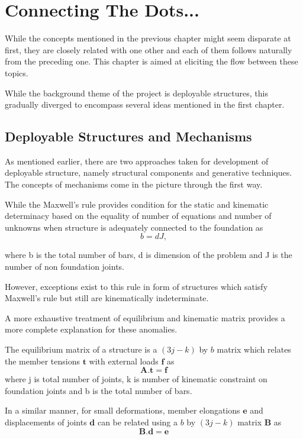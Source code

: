 \chapter{Connecting The Dots...}
While the concepts mentioned in the previous chapter might seem disparate at first, they are closely related with one other and each of them follows naturally from the preceding one. This chapter is aimed at eliciting the flow between these topics. 

While the background theme of the project is deployable structures, this gradually diverged to encompass several ideas mentioned in the first chapter.

\section{Deployable Structures and Mechanisms}
As mentioned earlier, there are two approaches taken for development of deployable structure, namely structural components and generative techniques. The concepts of mechanisms come in the picture through the first way. 

While the Maxwell's rule provides condition for the static and kinematic determinacy based on the equality of number of equations and number of unknowns when structure is adequately connected to the foundation as 
\begin{equation}
    b = dJ,
\label{eq:cacona}
\end{equation}

\noindent where b is the total number of bars, d is dimension of the problem and J is the number of non foundation joints.

However, exceptions exist to this rule in form of structures which satisfy Maxwell's rule but still are kinematically indeterminate.

A more exhaustive treatment of equilibrium and kinematic matrix provides a more complete explanation for these anomalies.

The equilibrium matrix of a structure is a $(3j - k)$ by $b$ matrix which relates the member tensions $\boldsymbol{t}$ with external loads $\boldsymbol{f}$ as
\begin{equation}
    \boldsymbol{A.t = f}
    \label{eq:cacona}
\end{equation}
\noindent where j is total number of joints, k is number of kinematic constraint on foundation joints and b is the total number of bars.

In a similar manner, for small deformations, member elongations $\boldsymbol{e}$ and displacements of joints $\boldsymbol{d}$ can be related using a $b$ by $(3j - k)$ matrix $\boldsymbol{B}$ as
\begin{equation}
    \boldsymbol{B.d = e}
    \label{eq:cacona}
\end{equation}

